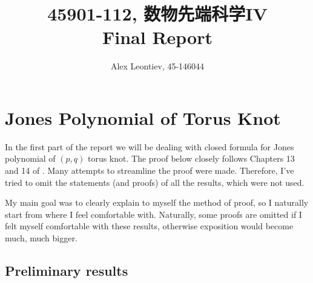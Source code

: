 \documentclass[10pt]{article} %
\title{45901-112, 数物先端科学IV\\Final Report}
\author{Alex Leontiev, 45-146044}
\theoremstyle{remark}
\begin{document}
\begin{CJK}{UTF8}{bsmi}
\maketitle
\end{CJK}
\tableofcontents
\section{Jones Polynomial of Torus Knot}
In the first part of the report we will be dealing with closed formula for Jones polynomial of $(p,q)$ torus knot. The proof below
closely follows Chapters 13 and 14 of \cite{Lickorish}. Many attempts to streamline the proof were made. Therefore, I've tried to omit the statements
(and proofs) of all the results, which were not used.

My main goal was to 
clearly explain to myself the method of proof, so I naturally start from where I feel comfortable with. Naturally, some proofs are omitted
if I felt myself comfortable with these results, otherwise exposition would become much, much bigger.
\subsection{Preliminary results}
\end{document}
